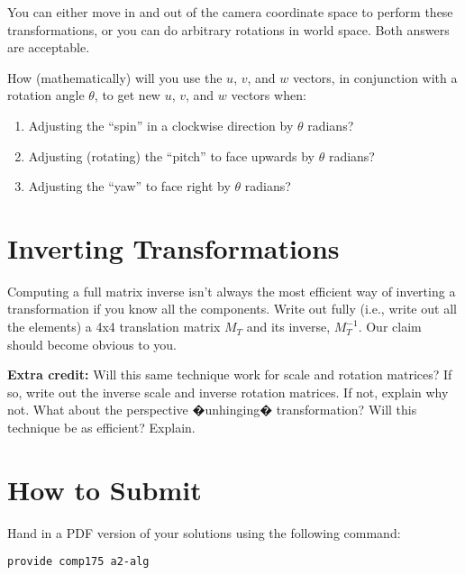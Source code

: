 \documentclass[10pt,twocolumn]{article}
\begin{document}
\noindent You can either move in and out of the camera coordinate space to perform these transformations, or you can do arbitrary rotations in world space. Both answers are acceptable.

\begin{framed}
\noindent {\bf [1/2 pt. each]} How (mathematically) will you use the $u$, $v$, and $w$ vectors, in conjunction with a rotation angle $\theta$, to get new $u$, $v$, and $w$ vectors when:
\begin{enumerate}
\item Adjusting the ``spin'' in a clockwise direction by $\theta$ radians?\\
\item Adjusting (rotating) the ``pitch'' to face upwards by $\theta$ radians?\\
\item Adjusting the ``yaw'' to face right by $\theta$ radians?\\
\end{enumerate}
\end{framed}

\section{Inverting Transformations}
\begin{framed}
\noindent {\bf [1 point]} Computing a full matrix inverse isn't always the most efficient way of inverting a transformation if you know all the components. Write out fully (i.e., write out all the elements) a 4x4 translation matrix $M_T$ and its inverse, $M^{-1}_T$. Our claim should become obvious to you.
\end{framed}

\begin{framed}
\vspace{10em}
\end{framed}


{\bf Extra credit:} Will this same technique work for scale and rotation matrices? If so, write out the inverse scale and inverse rotation matrices. If not, explain why not. What about the perspective �unhinging� transformation? Will this technique be as efficient? Explain.

\section{How to Submit}

Hand in a PDF version of your solutions using the following command:
\begin{center}
 {\tt provide comp175 a2-alg}
 \end{center}
\end{document}
